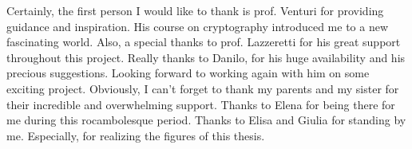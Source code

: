 \begin{acknowledgments}
    Certainly, the first person I would like to thank is prof. Venturi for providing guidance and inspiration.
    \newline
    His course on cryptography introduced me to a new fascinating world.
    \newline\newline
    Also, a special thanks to prof. Lazzeretti for his great support throughout this project.
    \newline\newline
    Really thanks to Danilo, for his huge availability and his precious suggestions.
    \newline
    Looking forward to working again with him on some exciting project.
    \newline\newline
    Obviously, I can't forget to thank my parents and my sister for their incredible and overwhelming support.
    \newline\newline
    Thanks to Elena for being there for me during this rocambolesque period.
    \newline\newline
    Thanks to Elisa and Giulia for standing by me.
    \newline
    Especially, for realizing the figures of this thesis.
\end{acknowledgments}